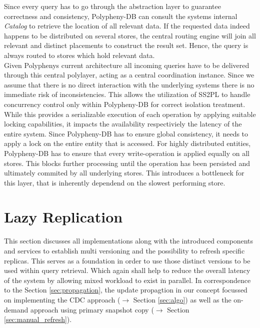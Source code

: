 Since every query has to go through the abstraction layer to guarantee correctness 
and consistency, Polypheny-DB can consult the systems internal \textit{Catalog} to retrieve the
location of all relevant data. 
If the requested data indeed happens to be distributed on several stores, the central routing engine will join all relevant and distinct 
placements to construct the result set. Hence, the query is always routed to stores which hold relevant data.\\


Given Polyphenys current architecture all incoming queries have to be delivered through this central polylayer, acting as a central coordination instance.
Since we assume that there is no direct interaction with the underlying systems there is no immediate risk of inconsistencies. 
This allows the utilization of SS2PL to handle concurrency control only within Polypheny-DB for correct isolation treatment.
While this provides a serializable execution of each operation by applying suitable locking capabilities, it impacts the availability respectiviely the latency of the entire system.
Since Polypheny-DB has to ensure global consistency, it needs to apply a lock on the entire entity that is accessed. 
For highly distributed entities, Polypheny-DB has to ensure that every write-operation is applied equally on all stores.
This blocks further processing until the operation has been persisted and ultimately commited by all underlying stores.
This introduces a bottleneck for this layer, that is inherently dependend on the slowest performing store.









\section{Lazy Replication}
\label{sec:lazy_replication}

This section discusses all implementations along with the introduced components and services to establish 
multi versioning and the possibility to refresh specific replicas. This serves as a foundation in order to use those distinct versions
to be used within query retrieval. Which again shall help to reduce the overall latency of the system by allowing mixed workload to exist in parallel.
In correspondence to the Section \ref{sec:propagation}, the update propagtion in our concept focussed on implementing the CDC approach ($\rightarrow$ Section \ref{sec:algo}) 
as well as the on-demand approach using primary snapshot copy ($\rightarrow$ Section \ref{sec:manual_refresh}).


